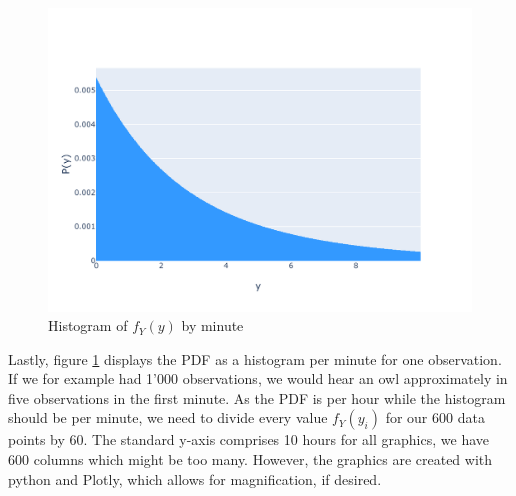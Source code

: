 \begin{figure}[h]
\centering
\includegraphics[width=17cm]{pics/1c4.pdf}
\caption{Histogram of $f_Y(y)$ by minute}
\label{fig:1c4}
\end{figure}
\FloatBarrier

Lastly, figure \ref{fig:1c4} displays the PDF as a histogram per minute for one observation. If we for example had 1'000 observations, we would hear an owl approximately in five observations in the first minute. As the PDF is per hour while the histogram should be per minute, we need to divide every value $f_Y(y_i)$ for our 600 data points by 60. The standard y-axis comprises 10 hours for all graphics, we have 600 columns which might be too many. However, the graphics are created with python and Plotly, which allows for magnification, if desired. 


